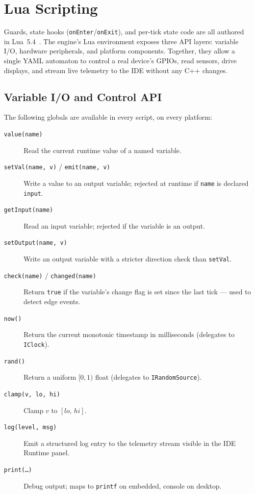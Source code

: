 \section{Lua Scripting}
\label{sec:lua}

Guards, state hooks (\texttt{onEnter}/\texttt{onExit}), and per-tick state code are all authored in Lua~5.4~\cite{Lua1996,LuaManual54}. The engine's Lua environment exposes three API layers: variable I/O, hardware peripherals, and platform components. Together, they allow a single YAML automaton to control a real device's GPIOs, read sensors, drive displays, and stream live telemetry to the IDE without any C++ changes.

\subsection{Variable I/O and Control API}

The following globals are available in every script, on every platform:

\begin{description}
  \item[\texttt{value(name)}] Read the current runtime value of a named variable.
  \item[\texttt{setVal(name, v)} / \texttt{emit(name, v)}] Write a value to an output variable; rejected at runtime if \texttt{name} is declared \texttt{input}.
  \item[\texttt{getInput(name)}] Read an input variable; rejected if the variable is an output.
  \item[\texttt{setOutput(name, v)}] Write an output variable with a stricter direction check than \texttt{setVal}.
  \item[\texttt{check(name)} / \texttt{changed(name)}] Return \texttt{true} if the variable's change flag is set since the last tick --- used to detect edge events.
  \item[\texttt{now()}] Return the current monotonic timestamp in milliseconds (delegates to \texttt{IClock}).
  \item[\texttt{rand()}] Return a uniform $[0,1)$ float (delegates to \texttt{IRandomSource}).
  \item[\texttt{clamp(v, lo, hi)}] Clamp $v$ to $[\mathit{lo},\, \mathit{hi}]$.
  \item[\texttt{log(level, msg)}] Emit a structured log entry to the telemetry stream visible in the IDE Runtime panel.
  \item[\texttt{print(\ldots)}] Debug output; maps to \texttt{printf} on embedded, console on desktop.
\end{description}


